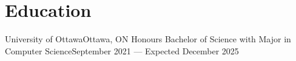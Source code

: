 \section{Education}
    \resumeSubHeadingListStart

    \resumeSubheading
    {University of Ottawa}{Ottawa, ON}
    {Honours Bachelor of Science with Major in Computer Science}{September 2021 — Expected December 2025}
    \resumeItemListStart
    \resumeItemListEnd

    \resumeSubHeadingListEnd
